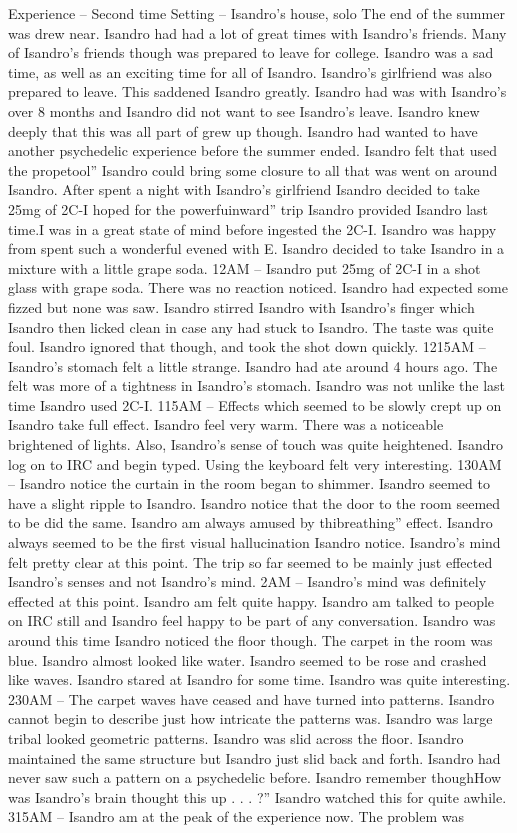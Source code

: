 \documentclass[12pt]{book}
\begin{document}
Experience -- Second time Setting -- Isandro's house, solo The end of the summer was drew near. Isandro had had a lot of great times with Isandro's friends. Many of Isandro's friends though was prepared to leave for college. Isandro was a sad time, as well as an exciting time for all of Isandro. Isandro's girlfriend was also prepared to leave. This saddened Isandro greatly. Isandro had was with Isandro's over 8 months and Isandro did not want to see Isandro's leave. Isandro knew deeply that this was all part of grew up though. Isandro had wanted to have another psychedelic experience before the summer ended. Isandro felt that used the propetool'' Isandro could bring some closure to all that was went on around Isandro. After spent a night with Isandro's girlfriend Isandro decided to take 25mg of 2C-I hoped for the powerfuinward'' trip Isandro provided Isandro last time.I was in a great state of mind before ingested the 2C-I. Isandro was happy from spent such a wonderful evened with E. Isandro decided to take Isandro in a mixture with a little grape soda. 12AM -- Isandro put 25mg of 2C-I in a shot glass with grape soda. There was no reaction noticed. Isandro had expected some fizzed but none was saw. Isandro stirred Isandro with Isandro's finger which Isandro then licked clean in case any had stuck to Isandro. The taste was quite foul. Isandro ignored that though, and took the shot down quickly. 1215AM -- Isandro's stomach felt a little strange. Isandro had ate around 4 hours ago. The felt was more of a tightness in Isandro's stomach. Isandro was not unlike the last time Isandro used 2C-I. 115AM -- Effects which seemed to be slowly crept up on Isandro take full effect. Isandro feel very warm. There was a noticeable brightened of lights. Also, Isandro's sense of touch was quite heightened. Isandro log on to IRC and begin typed. Using the keyboard felt very interesting. 130AM -- Isandro notice the curtain in the room began to shimmer. Isandro seemed to have a slight ripple to Isandro. Isandro notice that the door to the room seemed to be did the same. Isandro am always amused by thibreathing'' effect. Isandro always seemed to be the first visual hallucination Isandro notice. Isandro's mind felt pretty clear at this point. The trip so far seemed to be mainly just effected Isandro's senses and not Isandro's mind. 2AM -- Isandro's mind was definitely effected at this point. Isandro am felt quite happy. Isandro am talked to people on IRC still and Isandro feel happy to be part of any conversation. Isandro was around this time Isandro noticed the floor though. The carpet in the room was blue. Isandro almost looked like water. Isandro seemed to be rose and crashed like waves. Isandro stared at Isandro for some time. Isandro was quite interesting. 230AM -- The carpet waves have ceased and have turned into patterns. Isandro cannot begin to describe just how intricate the patterns was. Isandro was large tribal looked geometric patterns. Isandro was slid across the floor. Isandro maintained the same structure but Isandro just slid back and forth. Isandro had never saw such a pattern on a psychedelic before. Isandro remember thoughHow was Isandro's brain thought this up . . . ?'' Isandro watched this for quite awhile. 315AM -- Isandro am at the peak of the experience now. The problem was 
\end{document}
